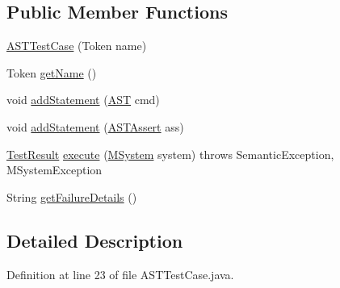 \subsection*{Public Member Functions}
\begin{DoxyCompactItemize}
\item 
\hyperlink{classorg_1_1tzi_1_1use_1_1parser_1_1testsuite_1_1_a_s_t_test_case_a2fc95ff92d33ecc471d06eeabebe9708}{A\-S\-T\-Test\-Case} (Token name)
\item 
Token \hyperlink{classorg_1_1tzi_1_1use_1_1parser_1_1testsuite_1_1_a_s_t_test_case_a51e577ba8988e02bf1afc5ee84a1cc39}{get\-Name} ()
\item 
void \hyperlink{classorg_1_1tzi_1_1use_1_1parser_1_1testsuite_1_1_a_s_t_test_case_a026fd80370ceb9c2312fb4d68b1600e7}{add\-Statement} (\hyperlink{classorg_1_1tzi_1_1use_1_1parser_1_1_a_s_t}{A\-S\-T} cmd)
\item 
void \hyperlink{classorg_1_1tzi_1_1use_1_1parser_1_1testsuite_1_1_a_s_t_test_case_a73860af4335443362ae1e805f1c3113f}{add\-Statement} (\hyperlink{classorg_1_1tzi_1_1use_1_1parser_1_1testsuite_1_1_a_s_t_assert}{A\-S\-T\-Assert} ass)
\item 
\hyperlink{enumorg_1_1tzi_1_1use_1_1parser_1_1testsuite_1_1_a_s_t_test_case_1_1_test_result}{Test\-Result} \hyperlink{classorg_1_1tzi_1_1use_1_1parser_1_1testsuite_1_1_a_s_t_test_case_a91d0fd36d355ff77147696a381c841be}{execute} (\hyperlink{classorg_1_1tzi_1_1use_1_1uml_1_1sys_1_1_m_system}{M\-System} system)  throws Semantic\-Exception, M\-System\-Exception 
\item 
String \hyperlink{classorg_1_1tzi_1_1use_1_1parser_1_1testsuite_1_1_a_s_t_test_case_aa2a21ec684a95f724100cca2886fac6c}{get\-Failure\-Details} ()
\end{DoxyCompactItemize}


\subsection{Detailed Description}


Definition at line 23 of file A\-S\-T\-Test\-Case.\-java.



